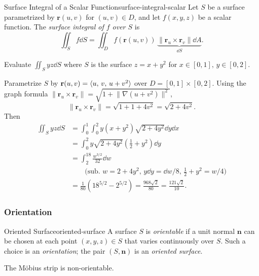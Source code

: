 \begin{definition}{Surface Integral of a Scalar Function}{surface-integral-scalar}
  Let $S$ be a surface parametrized by $\mathbf{r}(u,v)$ for $(u,v)\in D$, and let
  $f(x,y,z)$ be a scalar function. The \emph{surface integral of $f$ over $S$} is
  \[
    \iint_S f\dd{S}
    = \iint_D f(\mathbf{r}(u,v))\,
    \underbrace{\lVert\mathbf{r}_u\times\mathbf{r}_v\rVert\dd{A}}_{\dd{S}}.
  \]
\end{definition}

\begin{example}
  Evaluate $\displaystyle\iint_S yz\dd{S}$ where $S$ is the surface $z = x + y^2$ for
  $x\in[0,1],\,y\in[0,2]$.

  Parametrize $S$ by $\mathbf{r}(u,v) = \langle u,\,v,\,u+v^2 \rangle$ over $D = [0,1]\times[0,2]$.
  Using the graph formula $\lVert\mathbf{r}_u\times\mathbf{r}_v\rVert = \sqrt{1+\lVert\nabla(u+v^2)\rVert^2}$,
  \[
    \lVert\mathbf{r}_u\times\mathbf{r}_v\rVert = \sqrt{1 + 1 + 4v^2} = \sqrt{2 + 4v^2}.
  \]
  Then
  \begin{align*}
    \iint_S yz\dd{S}
     & = \int_0^1\!\int_0^2 y(x+y^2)\sqrt{2+4y^2}\dd{y}\dd{x}                    \\
     & = \int_0^2 y\sqrt{2+4y^2}\left(\tfrac{1}{2}+y^2\right)\dd{y}              \\
     & = \int_2^{18}\frac{w^{3/2}}{32}\dd{w}                                     \\
     & \qquad\text{(sub.\ $w = 2+4y^2$, $y\dd{y}=\dd{w}/8$, $\tfrac12+y^2=w/4$)} \\
     & = \frac{1}{80}(18^{5/2} - 2^{5/2})
    = \frac{968\sqrt{2}}{80}
    = \frac{121\sqrt{2}}{10}.
  \end{align*}
\end{example}

\subsubsection{Orientation}

\begin{definition}{Oriented Surface}{oriented-surface}
  A surface $S$ is \emph{orientable} if a unit normal $\mathbf{n}$ can be chosen at each point
  $(x,y,z)\in S$ that varies continuously over $S$. Such a choice is an \emph{orientation};
  the pair $(S,\mathbf{n})$ is an \emph{oriented surface}.
\end{definition}

\begin{remark}
  The Möbius strip is non-orientable.
\end{remark}

